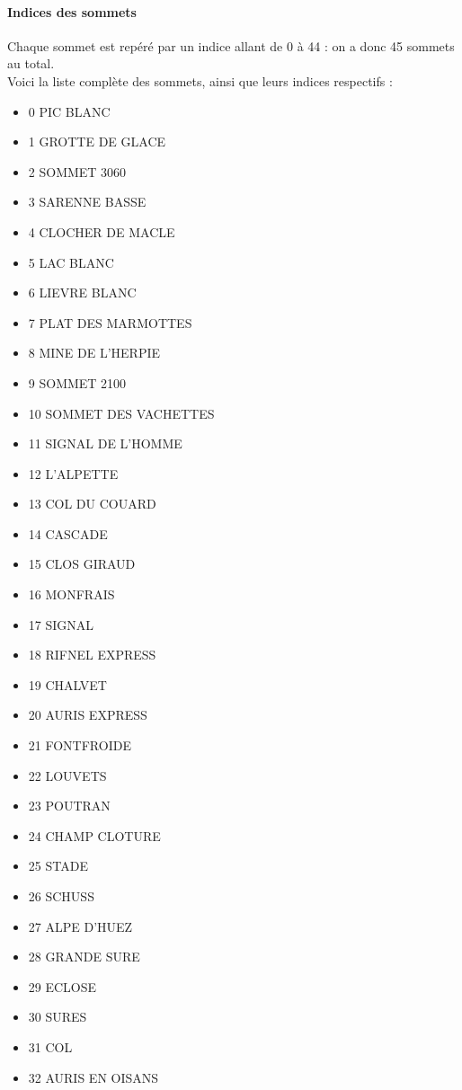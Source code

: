 \documentclass[a4]{article}
\begin{document}
			\paragraph{Indices des sommets\\}
			Chaque sommet est repéré par un indice allant de 0 à 44 : on a donc 45 sommets au total.\\
			Voici la liste complète des sommets, ainsi que leurs indices respectifs :
			\begin{itemize}
			\item 0 PIC BLANC
			\item 1 GROTTE DE GLACE
			\item 2 SOMMET 3060
			\item 3 SARENNE BASSE
			\item 4 CLOCHER DE MACLE
			\item 5 LAC BLANC
			\item 6 LIEVRE BLANC
			\item 7 PLAT DES MARMOTTES
			\item 8 MINE DE L'HERPIE
			\item 9 SOMMET 2100
			\item 10 SOMMET DES VACHETTES
			\item 11 SIGNAL DE L'HOMME
			\item 12 L'ALPETTE
			\item 13 COL DU COUARD
			\item 14 CASCADE
			\item 15 CLOS GIRAUD
			\item 16 MONFRAIS
			\item 17 SIGNAL
			\item 18 RIFNEL EXPRESS
			\item 19 CHALVET
			\item 20 AURIS EXPRESS
			\item 21 FONTFROIDE
			\item 22 LOUVETS
			\item 23 POUTRAN
			\item 24 CHAMP CLOTURE
			\item 25 STADE
			\item 26 SCHUSS
			\item 27 ALPE D'HUEZ
			\item 28 GRANDE SURE
			\item 29 ECLOSE
			\item 30 SURES
			\item 31 COL
			\item 32 AURIS EN OISANS

\end{itemize}
\end{document}
